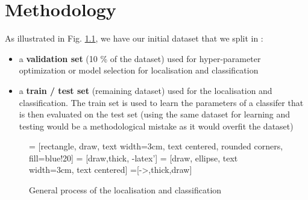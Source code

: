 \chapter{Methodology} \label{sec:methodology}

As illustrated in Fig. \ref{fig:tikz_methodology}, we have our initial dataset that we split in :
\begin{itemize}
    \item a \textbf{validation set} (10 \% of the dataset) used for hyper-parameter optimization or model selection for localisation and classification
    \item a \textbf{train / test set} (remaining dataset) used for the localisation and classification. The train set is used to learn the parameters of a classifer that is then evaluated on the test set (using the same dataset for learning and testing would be a methodological mistake as it would overfit the dataset)
\end{itemize}

\begin{figure}[h]
    \centering
     = [rectangle, draw, text width=3cm, text centered, rounded corners,  fill=blue!20]
     = [draw,thick, -latex']
     = [draw, ellipse, text width=3cm, text centered]
    =[->,thick,draw]
    \caption{General process of the localisation and classification}
    \label{fig:tikz_methodology}
\end{figure}

